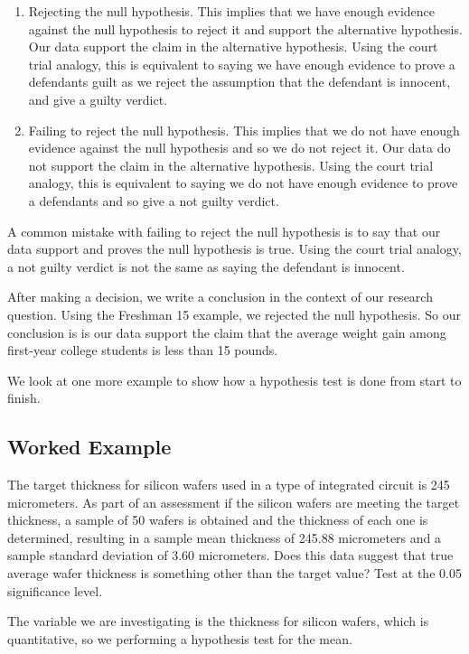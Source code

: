 \documentclass[
]{book}
\begin{document}
\begin{enumerate}
\def\labelenumi{\arabic{enumi}.}
\item
  Rejecting the null hypothesis. This implies that we have enough evidence against the null hypothesis to reject it and support the alternative hypothesis. Our data support the claim in the alternative hypothesis. Using the court trial analogy, this is equivalent to saying we have enough evidence to prove a defendants guilt as we reject the assumption that the defendant is innocent, and give a guilty verdict.
\item
  Failing to reject the null hypothesis. This implies that we do not have enough evidence against the null hypothesis and so we do not reject it. Our data do not support the claim in the alternative hypothesis. Using the court trial analogy, this is equivalent to saying we do not have enough evidence to prove a defendants and so give a not guilty verdict.
\end{enumerate}

A common mistake with failing to reject the null hypothesis is to say that our data support and proves the null hypothesis is true. Using the court trial analogy, a not guilty verdict is not the same as saying the defendant is innocent.

After making a decision, we write a conclusion in the context of our research question. Using the Freshman 15 example, we rejected the null hypothesis. So our conclusion is is our data support the claim that the average weight gain among first-year college students is less than 15 pounds.

We look at one more example to show how a hypothesis test is done from start to finish.

\subsection{Worked Example}\label{wafer}

The target thickness for silicon wafers used in a type of integrated circuit is 245 micrometers. As part of an assessment if the silicon wafers are meeting the target thickness, a sample of 50 wafers is obtained and the thickness of each one is determined, resulting in a sample mean thickness of 245.88 micrometers and a sample standard deviation of 3.60 micrometers. Does this data suggest that true average wafer thickness is something other than the target value? Test at the 0.05 significance level.

The variable we are investigating is the thickness for silicon wafers, which is quantitative, so we performing a hypothesis test for the mean.
\end{document}
